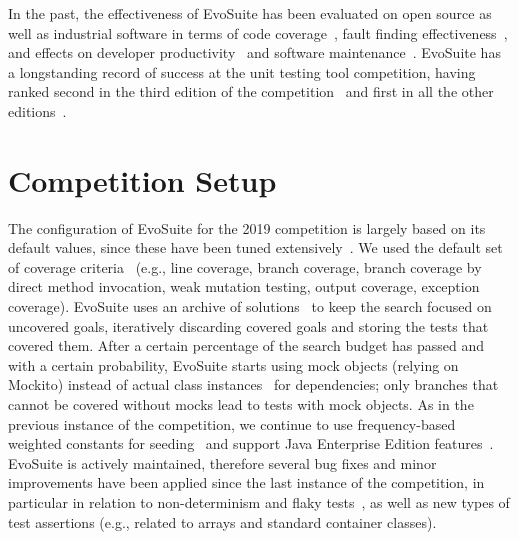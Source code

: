 \documentclass[sigconf,table]{acmart}
\newcommand{\TODO}[1]{\textbf{\textcolor{ScarletRed}{[TODO: #1]}}\xspace}
\newcommand{\TODO}[1]{}
\newcommand{\EVOSUITE}{{\sc EvoSuite}\xspace}
\begin{document}
In the past, the effectiveness of \EVOSUITE has been evaluated on open
source as well as industrial software in terms of code
coverage~\cite{fraser2014large,emse_archive,ea_evaluation,dynamosa},
fault finding
effectiveness~\cite{shamshiri2015automatically,moein2017}, and effects
on developer productivity~\cite{TOSEM_userstudy,ISSTA15_Study} and
software maintenance~\cite{ICST2018_Maintenance}.
%
\EVOSUITE has a longstanding record of success at the unit testing
tool competition, having ranked second in the third edition of the
competition~\cite{evosuiteAtSbst2015} and first in all the other
editions~\cite{evosuiteAtSbst2013,evosuiteAtFittest2013,evosuiteAtSbst2016,evosuiteAtSbst2017,evosuiteAtSbst2018}.




\section{Competition Setup}

The configuration of \EVOSUITE for the 2019 competition is largely
based on its default values, since these have been tuned
extensively~\cite{arcuri2013parameter}. We used the default set of
coverage criteria~\cite{rojas2015combining} (e.g., line coverage,
branch coverage, branch coverage by direct method invocation, weak
mutation testing, output coverage, exception coverage). \EVOSUITE uses
an archive of solutions~\cite{emse_archive} to keep the search focused
on uncovered goals, iteratively discarding covered goals and storing
the tests that covered them. After a certain percentage of the search
budget has passed and with a certain probability, \EVOSUITE starts
using mock objects (relying on Mockito) instead of actual class
instances~\cite{ICST_Mocking17} for dependencies; only branches that
cannot be covered without mocks lead to tests with mock objects. As in
the previous instance of the competition, we continue to use
frequency-based weighted constants for
seeding~\cite{sakti2015instance} and support Java Enterprise Edition
features~\cite{arcuri2016java}. %
\EVOSUITE is actively maintained, therefore several bug fixes and
minor improvements have been applied since the last instance of the
competition, in particular in relation to non-determinism and flaky
tests~\cite{arcuri2014automated}, as well as new types of test
assertions (e.g., related to arrays and standard container classes).
\end{document}
